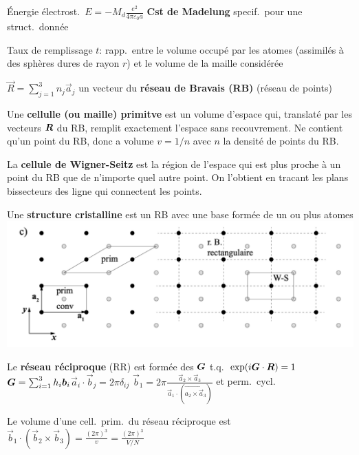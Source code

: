 \begin{squishlist}
    \item Énergie électrost.\ $E = - M_d \frac{e^2}{4\pi \varepsilon_0 a}$ \textbf{Cst de Madelung} specif.\ pour une struct.\ donnée
    \item Taux de remplissage $t$: rapp.\ entre le volume occupé par les atomes (assimilés à des sphères dures de rayon $r$) et le volume de la maille considérée
\end{squishlist}
\begin{squishlist}
    \item $\vec{R} = \sum_{j=1}^{3} n_j \vec{a}_j$ un vecteur du \textbf{réseau de Bravais (RB)} (réseau de points)
    \item Une \textbf{cellulle (ou maille) primitve} est un volume d'espace qui, translaté par les vecteurs $\bm{R}$ du RB, remplit exactement l'espace sans recouvrement. Ne contient qu'un point du RB, donc a volume $v = 1/n$ avec $n$ la densité de points du RB.
    \item La \textbf{cellule de Wigner-Seitz} est la région de l'espace qui est plus proche à un point du RB que de n'importe quel autre point. On l'obtient en tracant les plans bissecteurs des ligne qui connectent les points.
    \item Une \textbf{structure cristalline} est un RB avec une base formée de un ou plus atomes
        \includegraphics[width=0.6\columnwidth]{figures/structure-exemple.png}
    \item Le \textbf{réseau réciproque} (RR) est formée des $\bm{G}$ t.q.\ $\exp(i \bm{G} \cdot \bm{R}) = 1$ \\
    $\bm{G} = \sum_{i=1}^{3}h_i \bm{b}_i $\squishsep $\vec{a}_i \cdot \vec{b}_j = 2 \pi \delta_{ij}$ \squishsep $\vec{b}_1 = 2 \pi \frac{\vec{a}_2 \times \vec{a}_3}{\vec{a}_1 \cdot (\vec{a_2 \times \vec{a}_3})}$ et perm.\ cycl.\ 
    \item Le volume d'une cell.\ prim.\ du réseau réciproque est $\vec{b}_1 \cdot (\vec{b}_2 \times \vec{b}_3) = \frac{(2\pi)^3}{v} = \frac{(2\pi)^3}{V/N}$
\end{squishlist}    

